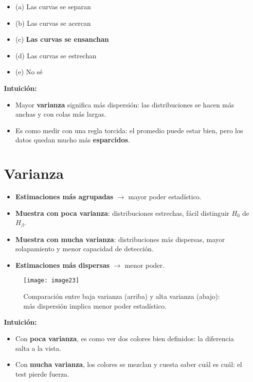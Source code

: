 \documentclass[12pt]{article}
\begin{document}
\begin{itemize}
    \item (a) Las curvas se separan
    \item (b) Las curvas se acercan
    \item (c) \textbf{Las curvas se ensanchan}
    \item (d) Las curvas se estrechan
    \item (e) No sé
\end{itemize}

\textbf{Intuición:}
\begin{itemize}
    \item Mayor \textbf{varianza} significa más dispersión: las distribuciones se hacen más anchas y con colas más largas.
    \item Es como medir con una regla torcida: el promedio puede estar bien, pero los datos quedan mucho más \textbf{esparcidos}.
\end{itemize}

\section*{\noindent\textbf{Varianza}}

\begin{itemize}
    \item \textbf{Estimaciones más agrupadas} $\rightarrow$ mayor poder estadístico.
    \item \textbf{Muestra con poca varianza}: distribuciones estrechas, fácil distinguir $H_0$ de $H_\beta$.
    \item \textbf{Muestra con mucha varianza}: distribuciones más dispersas, mayor solapamiento y menor capacidad de detección.
    \item \textbf{Estimaciones más dispersas} $\rightarrow$ menor poder.
\end{itemize}

\begin{figure}[H]
    \centering
    \texttt{[image: image23]}
    \caption{\footnotesize Comparación entre baja varianza (arriba) y alta varianza (abajo): más dispersión implica menor poder estadístico.}
\end{figure}

\textbf{Intuición:}
\begin{itemize}
    \item Con \textbf{poca varianza}, es como ver dos colores bien definidos: la diferencia salta a la vista.  
    \item Con \textbf{mucha varianza}, los colores se mezclan y cuesta saber cuál es cuál: el test pierde fuerza.
\end{itemize}
\end{document}
